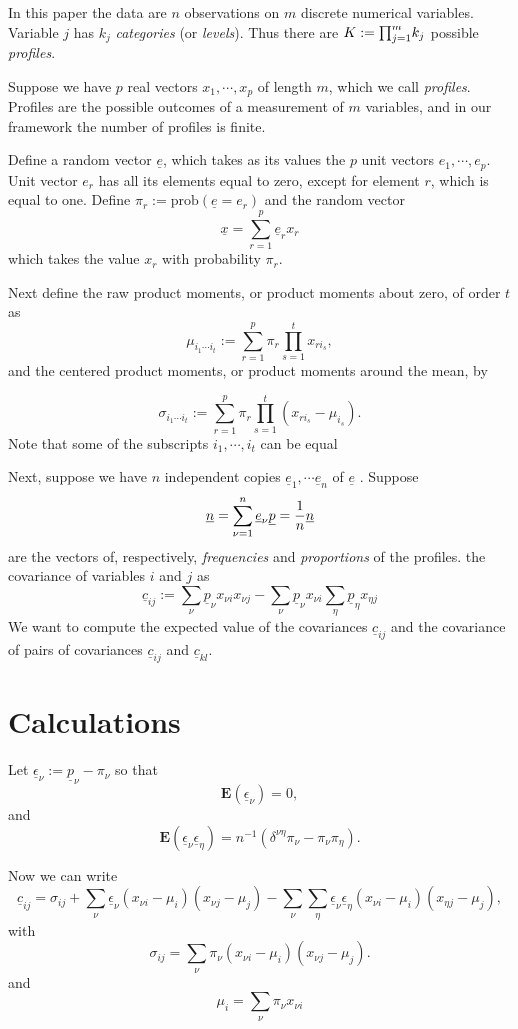 \documentclass[
  12pt,
  letterpaper,
  DIV=11,
  numbers=noendperiod]{scrartcl}
\newcommand{\ul}[1]{\underline{#1}}
\begin{document}
In this paper the data are \(n\) observations on \(m\) discrete
numerical variables. Variable \(j\) has \(k_j\) \emph{categories} (or
\emph{levels}). Thus there are \(K:=\smash{\prod_{j=1}^m}k_j\) possible
\emph{profiles}.

Suppose we have \(p\) real vectors \(x_1,\cdots,x_p\) of length \(m\),
which we call \emph{profiles}. Profiles are the possible outcomes of a
measurement of \(m\) variables, and in our framework the number of
profiles is finite.

Define a random vector \(\ul{e}\), which takes as its values the \(p\)
unit vectors \(e_1,\cdots,e_p\). Unit vector \(e_r\) has all its
elements equal to zero, except for element \(r\), which is equal to one.
Define \(\pi_r:=\text{prob}(\ul{e}=e_r)\) and the random vector \[
\ul{x}=\sum_{r=1}^p\ul{e}_rx_r
\] which takes the value \(x_r\) with probability \(\pi_r\).

Next define the raw product moments, or product moments about zero, of
order \(t\) as \[
\mu_{i_1\cdots i_t}:=\sum_{r=1}^p \pi_r\prod_{s=1}^tx_{ri_s},
\] and the centered product moments, or product moments around the mean,
by

\[
\sigma_{i_1\cdots i_t}:=\sum_{r=1}^p \pi_r\prod_{s=1}^t(x_{ri_s}-\mu_{i_s}).
\] Note that some of the subscripts \(i_1,\cdots,i_t\) can be equal

Next, suppose we have \(n\) independent copies
\(\ul{e}_1,\cdots\ul{e}_n\) of \(\ul{e}\) . Suppose \[
\ul{n}=\sum_{\nu=1}^n\ul{e}_\nu\\
\ul{p}=\frac{1}{n}\ul{n}
\] are the vectors of, respectively, \emph{frequencies} and
\emph{proportions} of the profiles. the covariance of variables \(i\)
and \(j\) as \[
\ul{c}_{ij}:=\sum_\nu \ul{p}_\nu x_{\nu i}x_{\nu j}-\sum_\nu \ul{p}_\nu x_{\nu i}\sum_\eta\ul{p}_\eta x_{\eta j}
\] We want to compute the expected value of the covariances
\(\ul{c}_{ij}\) and the covariance of pairs of covariances
\(\ul{c}_{ij}\) and \(\ul{c}_{kl}\).

\section{Calculations}\label{calculations}

Let \(\ul{\epsilon}_\nu:=\ul{p}_\nu-\pi_\nu\) so that \[
\mathbf{E}(\ul{\epsilon}_\nu)=0,
\] and \[
\mathbf{E}(\ul{\epsilon}_\nu\ul{\epsilon}_\eta)=n^{-1}(\delta^{\nu\eta}\pi_\nu-\pi_\nu\pi_\eta).
\]

Now we can write \[
\ul{c}_{ij}=\sigma_{ij}+\sum_\nu \ul{\epsilon}_\nu(x_{\nu i}-\mu_i)(x_{\nu j}-\mu_j)
-\sum_\nu\sum_\eta\ul{\epsilon}_\nu\ul{\epsilon}_\eta(x_{\nu i}-\mu_i)(x_{\eta j}-\mu_j),
\] with \[
\sigma_{ij}=\sum_\nu\pi_\nu(x_{\nu i}-\mu_i)(x_{\nu j}-\mu_j).
\] and \[
\mu_i=\sum_\nu \pi_\nu x_{\nu i}
\]
\end{document}
